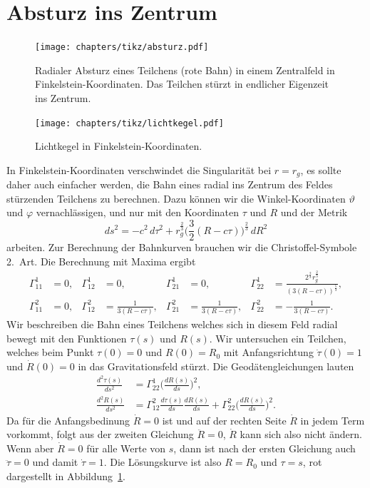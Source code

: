 \section{Absturz ins Zentrum}
\begin{figure}
\centering
\texttt{[image: chapters/tikz/absturz.pdf]}
\caption{Radialer Absturz eines Teilchens (rote Bahn) in einem Zentralfeld
in Finkelstein-Koordinaten.
Das Teilchen stürzt in endlicher Eigenzeit ins Zentrum.
\label{skript:kruemmung:fig:absturz}}
\end{figure}
\begin{figure}
\centering
\texttt{[image: chapters/tikz/lichtkegel.pdf]}
\caption{Lichtkegel in Finkelstein-Koordinaten.
\label{skript:kruemmung:fig:lichtkegel}}
\end{figure}
In Finkelstein-Koordinaten verschwindet die Singularität bei $r=r_g$,
es sollte daher auch einfacher werden, die Bahn eines radial ins
Zentrum des Feldes stürzenden Teilchens zu berechnen.
Dazu können wir die Winkel-Koordinaten $\vartheta$ und $\varphi$
vernachlässigen, und nur mit den Koordinaten $\tau$ und $R$ und der
Metrik
\[
ds^2
=
-c^2 \,d\tau^2
+r _g^{\frac23}\biggl(\frac32(R-c\tau)\biggr)^{\frac23}\,dR^2
\]
arbeiten.
Zur Berechnung der Bahnkurven brauchen wir die Christoffel-Symbole
2.~Art.
Die Berechnung mit Maxima ergibt
\begin{align*}
\Gamma^1_{11} &= 0,&
\Gamma^1_{12} &= 0,&
\Gamma^1_{21} &= 0,&
\Gamma^1_{22} &= \frac{2^{\frac23}r_g^{\frac23}}{(3(R-c\tau))^{\frac53}},\\
\Gamma^2_{11} &= 0,&
\Gamma^2_{12} &= \frac1{3(R-c\tau)},&
\Gamma^2_{21} &= \frac1{3(R-c\tau)},&
\Gamma^2_{22} &= -\frac1{3(R-c\tau)}.
\end{align*}
Wir beschreiben die Bahn eines Teilchens welches sich in diesem Feld
radial bewegt mit den Funktionen $\tau(s)$ und $R(s)$.
Wir untersuchen ein Teilchen, welches beim Punkt $\tau(0)=0$ und $R(0)=R_0$
mit Anfangsrichtung $\dot\tau(0)=1$ und $\dot R(0)=0$ in das Gravitationsfeld
stürzt.
Die Geodätengleichungen lauten
\begin{align*}
\frac{d^2\tau(s)}{ds^2}
&=
\Gamma^1_{22}\biggl(\frac{dR(s)}{ds}\biggr)^2,
\\
\frac{d^2R(s)}{ds^2}
&=
\Gamma^2_{12}\frac{d\tau(s)}{ds}\frac{dR(s)}{ds}
+
\Gamma^2_{22}\biggl(\frac{dR(s)}{ds}\biggr)^2.
\end{align*}
Da für die Anfangsbedinung $\dot R=0$ ist und auf der rechten Seite
$\dot R$ in jedem Term vorkommt, folgt aus der zweiten Gleichung
$\ddot R=0$, $\dot R$ kann sich also nicht ändern.
Wenn aber $\dot R=0$ für alle Werte von $s$, dann ist nach der ersten
Gleichung auch $\ddot \tau=0$ und damit $\dot \tau=1$.
Die Lösungskurve ist also $R=R_0$ und $\tau=s$, rot dargestellt in
Abbildung~\ref{skript:kruemmung:fig:absturz}.

